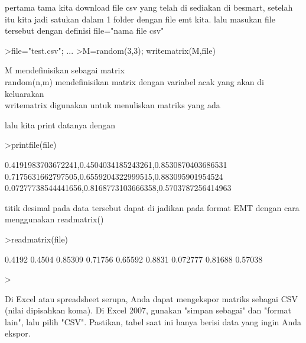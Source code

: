 \documentclass[a4paper,10pt]{article}
\begin{document}
\begin{eulernotebook}
\begin{eulercomment}
\begin{eulercomment}
\begin{eulercomment}
\begin{eulercomment}
\begin{eulercomment}
\begin{eulercomment}
\begin{eulercomment}
\begin{eulercomment}
\begin{eulercomment}
\begin{eulercomment}
\begin{eulercomment}
pertama tama kita download file csv yang telah di sediakan di besmart,
setelah itu kita jadi satukan dalam 1 folder dengan file emt kita.
lalu masukan file tersebut dengan definisi file="nama file csv"
\end{eulercomment}
\begin{eulerprompt}
>file="test.csv";  ...
>M=random(3,3); writematrix(M,file)
\end{eulerprompt}
\begin{eulercomment}
M mendefinisikan sebagai matrix\\
random(n,m) mendefinisikan matrix dengan variabel acak yang akan di
keluarakan\\
writematrix digunakan untuk menuliskan matriks yang ada

lalu kita print datanya dengan
\end{eulercomment}
\begin{eulerprompt}
>printfile(file)
\end{eulerprompt}
\begin{euleroutput}
  0.4191983703672241,0.4504034185243261,0.8530870403686531
  0.7175631662797505,0.6559204322999515,0.883095901954524
  0.07277738544441656,0.8168773103666358,0.5703787256414963
  
\end{euleroutput}
\begin{eulercomment}
titik desimal pada data tersebut dapat di jadikan pada format EMT
dengan cara menggunakan readmatrix()
\end{eulercomment}
\begin{eulerprompt}
>readmatrix(file)
\end{eulerprompt}
\begin{euleroutput}
     0.4192    0.4504   0.85309 
    0.71756   0.65592    0.8831 
   0.072777   0.81688   0.57038 
\end{euleroutput}
\begin{eulerprompt}
> 
\end{eulerprompt}
\begin{eulercomment}
Di Excel atau spreadsheet serupa, Anda dapat mengekspor matriks
sebagai CSV (nilai dipisahkan koma). Di Excel 2007, gunakan "simpan
sebagai" dan "format lain", lalu pilih "CSV". Pastikan, tabel saat ini
hanya berisi data yang ingin Anda ekspor.


\end{eulercomment}
\end{eulercomment}
\end{eulercomment}
\end{eulercomment}
\end{eulercomment}
\end{eulercomment}
\end{eulercomment}
\end{eulercomment}
\end{eulercomment}
\end{eulercomment}
\end{eulercomment}
\end{eulernotebook}
\end{document}
